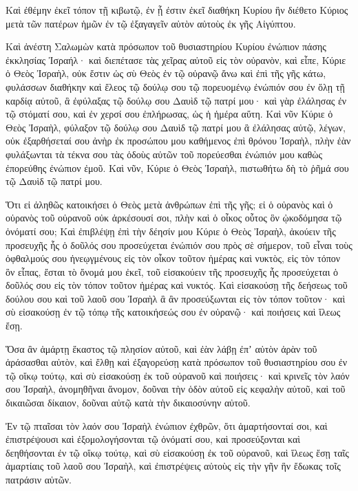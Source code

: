 {Καὶ ἐθέμην ἐκεῖ τόπον τῇ κιβωτῷ, ἐν ᾗ ἐστιν ἐκεῖ διαθήκη Κυρίου ἣν διέθετο Κύριος μετὰ τῶν πατέρων ἡμῶν ἐν τῷ ἐξαγαγεῖν αὐτὸν αὐτοὺς ἐκ γῆς Αἰγύπτου.
\par }{\PP {}Καὶ ἀνέστη Σαλωμὼν κατὰ πρόσωπον τοῦ θυσιαστηρίου Κυρίου ἐνώπιον πάσης ἐκκλησίας Ἰσραήλ· καὶ διεπέτασε τὰς χεῖρας αὐτοῦ εἰς τὸν οὐρανὸν,
καὶ εἶπε, Κύριε ὁ Θεὸς Ἰσραὴλ, οὐκ ἔστιν ὡς σὺ Θεὸς ἐν τῷ οὐρανῷ ἄνω καὶ ἐπὶ τῆς γῆς κάτω, φυλάσσων διαθήκην καὶ ἔλεος τῷ δούλῳ σου τῷ πορευομένῳ ἐνώπιόν σου ἐν ὅλῃ τῇ καρδίᾳ αὐτοῦ,
ἃ ἐφύλαξας τῷ δούλῳ σου Δαυὶδ τῷ πατρί μου· καὶ γὰρ ἐλάλησας ἐν τῷ στόματί σου, καὶ ἐν χερσί σου ἐπλήρωσας, ὡς ἡ ἡμέρα αὕτη.
Καὶ νῦν Κύριε ὁ Θεὸς Ἰσραὴλ, φύλαξον τῷ δούλῳ σου Δαυὶδ τῷ πατρί μου ἃ ἐλάλησας αὐτῷ, λέγων, οὐκ ἐξαρθήσεταί σου ἀνὴρ ἐκ προσώπου μου καθήμενος ἐπὶ θρόνου Ἰσραὴλ, πλὴν ἐὰν φυλάξωνται τὰ τέκνα σου τὰς ὁδοὺς αὐτῶν τοῦ πορεύεσθαι ἐνώπιόν μου καθὼς ἐπορεύθης ἐνώπιον ἐμοῦ.
Καὶ νῦν, Κύριε ὁ Θεὸς Ἰσραὴλ, πιστωθήτω δὴ τὸ ῥῆμά σου τῷ Δαυὶδ τῷ πατρί μου.
\par }{\PP {}Ὅτι εἰ ἀληθῶς κατοικήσει ὁ Θεὸς μετὰ ἀνθρώπων ἐπὶ τῆς γῆς; εἰ ὁ οὐρανὸς καὶ ὁ οὐρανὸς τοῦ οὐρανοῦ οὐκ ἀρκέσουσί σοι, πλὴν καὶ ὁ οἶκος οὗτος ὃν ᾠκοδόμησα τῷ ὀνόματί σου;
Καὶ ἐπιβλέψῃ ἐπὶ τὴν δέησίν μου Κύριε ὁ Θεὸς Ἰσραὴλ, ἀκούειν τῆς προσευχῆς ἧς ὁ δοῦλός σου προσεύχεται ἐνώπιόν σου πρὸς σὲ σήμερον,
τοῦ εἶναι τοὺς ὀφθαλμούς σου ἠνεῳγμένους εἰς τὸν οἶκον τοῦτον ἡμέρας καὶ νυκτὸς, εἰς τὸν τόπον ὃν εἶπας, ἔσται τὸ ὄνομά μου ἐκεῖ, τοῦ εἰσακούειν τῆς προσευχῆς ἧς προσεύχεται ὁ δοῦλός σου εἰς τὸν τόπον τοῦτον ἡμέρας καὶ νυκτός.
Καὶ εἰσακούσῃ τῆς δεήσεως τοῦ δούλου σου καὶ τοῦ λαοῦ σου Ἰσραὴλ ἃ ἂν προσεύξωνται εἰς τὸν τόπον τοῦτον· καὶ σὺ εἰσακούσῃ ἐν τῷ τόπῳ τῆς κατοικήσεώς σου ἐν οὐρανῷ· καὶ ποιήσεις καὶ ἵλεως ἔσῃ.
\par }{\PP {}Ὅσα ἂν ἁμάρτῃ ἕκαστος τῷ πλησίον αὐτοῦ, καὶ ἐὰν λάβῃ ἐπʼ αὐτὸν ἀρὰν τοῦ ἀράσασθαι αὐτὸν, καὶ ἔλθῃ καὶ ἐξαγορεύσῃ κατὰ πρόσωπον τοῦ θυσιαστηρίου σου ἐν τῷ οἴκῳ τούτῳ,
καὶ σὺ εἰσακούσῃ ἐκ τοῦ οὐρανοῦ καὶ ποιήσεις· καὶ κρινεῖς τὸν λαόν σου Ἰσραὴλ, ἀνομηθῆναι ἄνομον, δοῦναι τὴν ὁδὸν αὐτοῦ εἰς κεφαλὴν αὐτοῦ, καὶ τοῦ δικαιῶσαι δίκαιον, δοῦναι αὐτῷ κατὰ τὴν δικαιοσύνην αὐτοῦ.
\par }{\PP {}Ἐν τῷ πταῖσαι τὸν λαόν σου Ἰσραὴλ ἐνώπιον ἐχθρῶν, ὅτι ἁμαρτήσονταί σοι, καὶ ἐπιστρέψουσι καὶ ἐξομολογήσονται τῷ ὀνόματί σου, καὶ προσεύξονται καὶ δεηθήσονται ἐν τῷ οἴκῳ τούτῳ,
καὶ σὺ εἰσακούσῃ ἐκ τοῦ οὐρανοῦ, καὶ ἵλεως ἔσῃ ταῖς ἁμαρτίαις τοῦ λαοῦ σου Ἰσραὴλ, καὶ ἐπιστρέψεις αὐτοὺς εἰς τὴν γῆν ἣν ἔδωκας τοῖς πατράσιν αὐτῶν.
}
